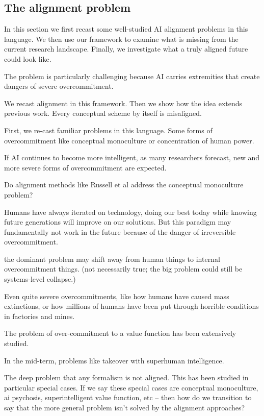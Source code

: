 \subsection{The alignment problem}


In this section we first recast some well-studied AI alignment problems in this language. We then use our framework to examine what is missing from the current research landscape. Finally, we investigate what a truly aligned future could look like.

The problem is particularly challenging because AI carries extremities that create dangers of severe overcommitment. 

We recast alignment in this framework. Then we show how the idea extends previous work. Every conceptual scheme by itself is misaligned. 

First, we re-cast familiar problems in this language. Some forms of overcommitment  like conceptual monoculture or concentration of human power. 

If AI continues to become more intelligent, as many researchers forecast, new and more severe forms of overcommitment are expected. 

Do alignment methods like Russell et al address the conceptual monoculture problem?

Humans have always iterated on technology, doing our best today while knowing future generations will improve on our solutions. But this paradigm may fundamentally not work in the future because of the danger of irreversible overcommitment.

the dominant problem may shift away from human things to internal overcommitment things. (not necessarily true; the big problem could still be systems-level collapse.)

Even quite severe overcommitments, like how humans have caused mass extinctions, or how millions of humans have been put through horrible conditions in factories and mines.

The problem of over-commitment to a value function has been extensively studied.

In the mid-term, problems like takeover with superhuman intelligence. 

The deep problem that any formalism is not aligned. This has been studied in particular special cases. If we say these special cases are conceptual monoculture, ai psychosis, superintelligent value function, etc -- then how do we transition to say that the more general problem isn't solved by the alignment approaches?

